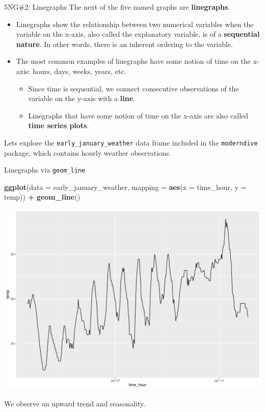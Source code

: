 \documentclass[
  ignorenonframetext,
]{beamer}
\newenvironment{Shaded}{\begin{snugshade}}{\end{snugshade}}
\newcommand{\AttributeTok}[1]{\textcolor[rgb]{0.13,0.29,0.53}{#1}}
\newcommand{\FunctionTok}[1]{\textcolor[rgb]{0.13,0.29,0.53}{\textbf{#1}}}
\newcommand{\NormalTok}[1]{#1}
\newcommand{\SpecialCharTok}[1]{\textcolor[rgb]{0.81,0.36,0.00}{\textbf{#1}}}
\providecommand{\tightlist}{%
  \setlength{\itemsep}{0pt}\setlength{\parskip}{0pt}}
\begin{document}
\begin{frame}[fragile]{5NG\#2: Linegraphs}
\protect\hypertarget{ng2-linegraphs}{}
The next of the five named graphs are \textbf{linegraphs}.

\begin{itemize}
\item
  Linegraphs show the relationship between two numerical variables when
  the variable on the x-axis, also called the explanatory variable, is
  of a \textbf{sequential nature}. In other words, there is an inherent
  ordering to the variable.
\item
  The most common examples of linegraphs have some notion of time on the
  x-axis: hours, days, weeks, years, etc.

  \begin{itemize}
  \tightlist
  \item
    Since time is sequential, we connect consecutive observations of the
    variable on the y-axis with a \textbf{line}.
  \item
    Linegraphs that have some notion of time on the x-axis are also
    called \textbf{time series plots}.
  \end{itemize}
\end{itemize}

Lets explore the \texttt{early\_january\_weather} data frame included in
the \texttt{moderndive} package, which contains hourly weather
observations.
\end{frame}

\begin{frame}[fragile]{Linegraphs via \texttt{geom\_line}}
\protect\hypertarget{linegraphs-via-geom_line}{}
\tiny

\begin{Shaded}
\begin{Highlighting}[]
\FunctionTok{ggplot}\NormalTok{(}\AttributeTok{data =}\NormalTok{ early\_january\_weather, }
       \AttributeTok{mapping =} \FunctionTok{aes}\NormalTok{(}\AttributeTok{x =}\NormalTok{ time\_hour, }\AttributeTok{y =}\NormalTok{ temp)) }\SpecialCharTok{+}
  \FunctionTok{geom\_line}\NormalTok{()}
\end{Highlighting}
\end{Shaded}

\begin{center}\includegraphics[width=0.7\linewidth,height=0.5\textheight]{Week2_Lect_files/figure-beamer/unnamed-chunk-25-1} \end{center}
\normalsize

We observe an upward trend and seasonality.
\end{frame}
\end{document}
